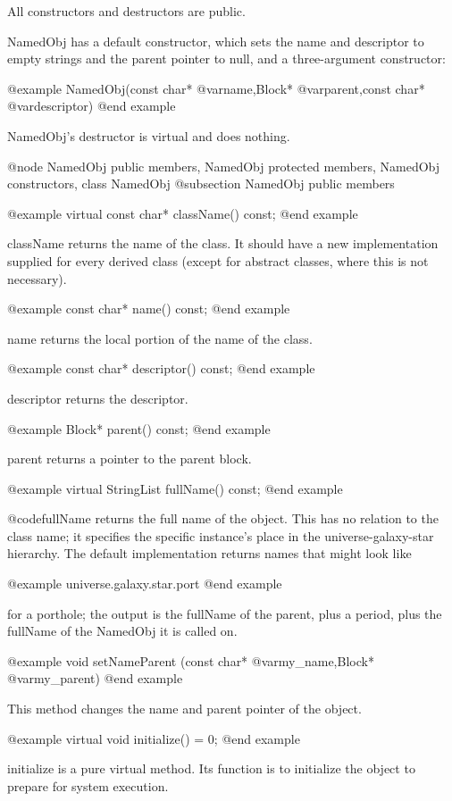 All constructors and destructors are public.

NamedObj has a default constructor, which sets the name and
descriptor to empty strings and the parent pointer to null, and a
three-argument constructor:

@example
NamedObj(const char* @var{name},Block* @var{parent},const char* @var{descriptor})
@end example

NamedObj's destructor is virtual and does nothing.

@node NamedObj public members, NamedObj protected members, NamedObj constructors, class NamedObj
@subsection NamedObj public members

@example
virtual const char* className() const;
@end example

className returns the name of the class.  It should have a new
implementation supplied for every derived class (except for abstract
classes, where this is not necessary).

@example
const char* name() const;
@end example

name returns the local portion of the name of the class.

@example
const char* descriptor() const;
@end example

descriptor returns the descriptor.

@example
Block* parent() const;
@end example

parent returns a pointer to the parent block.

@example
virtual StringList fullName() const;
@end example

@code{fullName} returns the full name of the object.  This has no
relation to the class name; it specifies the specific instance's place
in the universe-galaxy-star hierarchy.  The default
implementation returns names that might look like

@example
universe.galaxy.star.port
@end example

for a porthole; the output is the fullName of the parent, plus a period,
plus the fullName of the NamedObj it is called on.

@example
void setNameParent (const char* @var{my_name},Block* @var{my_parent})
@end example

This method changes the name and parent pointer of the object.

@example
virtual void initialize() = 0;
@end example

initialize is a pure virtual method.  Its function is to initialize the
object to prepare for system execution.


